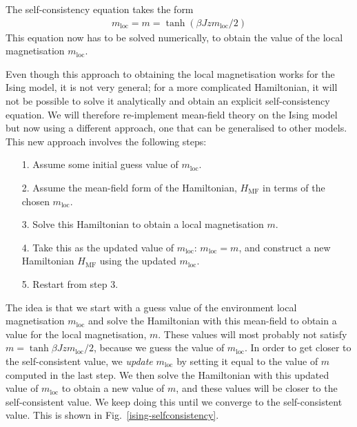 \documentclass[12pt,onecolumn]{revtex4-2}
\begin{document}
The self-consistency equation takes the form
\begin{equation}\begin{aligned}
	m_\text{loc} = m = \tanh \left(\beta Jzm_\text{loc}/2\right)
\end{aligned}\end{equation}
This equation now has to be solved numerically, to obtain the value of the local magnetisation \(m_\text{loc}\). 

Even though this approach to obtaining the local magnetisation works for the Ising model, it is not very general; for a more complicated Hamiltonian, it will not be possible to solve it analytically and obtain an explicit self-consistency equation. We will therefore re-implement mean-field theory on the Ising model but now using a different approach, one that can be generalised to other models. This new approach involves the following steps:
\begin{itemize}
	\item[1.] Assume some initial guess value of \(m_\text{loc}\).
	\item[2.] Assume the mean-field form of the Hamiltonian, \(H_\text{MF}\) in terms of the chosen \(m_\text{loc}\).
	\item[3.] Solve this Hamiltonian to obtain a local magnetisation \(m\).
	\item[4.] Take this as the updated value of \(m_\text{loc}\): \(m_\text{loc} = m\), and construct a new Hamiltonian \(H_\text{MF}\) using the updated \(m_\text{loc}\).
	\item[5.] Restart from step 3.
\end{itemize}
The idea is that we start with a guess value of the environment local magnetisation \(m_\text{loc}\) and solve the Hamiltonian with this mean-field to obtain a value for the local magnetisation, \(m\). These values will most probably not satisfy \(m = \tanh \beta J z m_\text{loc}/2\), because we guess the value of \(m_\text{loc}\). In order to get closer to the self-consistent value, we {\it update} \(m_\text{loc}\) by setting it equal to the value of \(m\) computed in the last step. We then solve the Hamiltonian with this updated value of \(m_\text{loc}\) to obtain a new value of \(m\), and these values will be closer to the self-consistent value. We keep doing this until we converge to the self-consistent value. This is shown in Fig.~\ref{ising-selfconsistency}.
\end{document}
